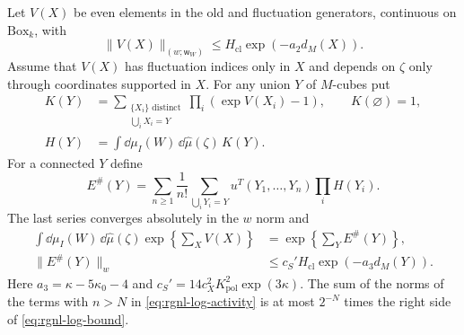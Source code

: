 \begin{proposition}\label{prop:rgnl-cluster-logarithm}
Let $V(X)$ be even elements in the old and fluctuation
generators, continuous on $\mathrm{Box}_k$, with
\[
 \|V(X)\|_{(w;\mathsf w_W)}
                       \le H_{\mathrm{cl}}\exp(-a_2d_M(X)).
\]
Assume that $V(X)$ has fluctuation indices only in $X$ and
depends on $\zeta$ only through coordinates supported in $X$.
For any union $Y$ of $M$-cubes put
\begin{align}
 K(Y)&=\sum_{\substack{\{X_i\}\text{ distinct}\\\bigcup_iX_i=Y}}
                    \prod_i(\exp V(X_i)-1),\qquad K(\varnothing)=1,
                                      \label{eq:rgnl-Mayer-activity}\\
 H(Y)&=\int\dd\mu_I(W)\,\dd\widehat\mu(\zeta)\,K(Y).
                                      \label{eq:rgnl-integrated-activity}
\end{align}
For a connected $Y$ define
\begin{equation}\label{eq:rgnl-log-activity}
 E^\#(Y)=\sum_{n\ge1}\frac1{n!}
   \sum_{\bigcup_iY_i=Y}u^T(Y_1,\ldots,Y_n)\prod_iH(Y_i).
\end{equation}
The last series converges absolutely in the $w$ norm and
\begin{align}
 \int\dd\mu_I(W)\,\dd\widehat\mu(\zeta)
                         \exp\left\{\sum_XV(X)\right\}
       &=\exp\left\{\sum_YE^\#(Y)\right\},
                                      \label{eq:rgnl-log-identity}\\
 \|E^\#(Y)\|_w
       &\le c_S'H_{\mathrm{cl}}\exp(-a_3d_M(Y)).
                                      \label{eq:rgnl-log-bound}
\end{align}
Here $a_3=\kappa-5\kappa_0-4$ and
$c_S'=14c_X^2K_{\mathrm{pol}}^2\exp(3\kappa)$.
The sum of the norms of the terms with $n>N$ in
\eqref{eq:rgnl-log-activity} is at most $2^{-N}$ times the
right side of \eqref{eq:rgnl-log-bound}.
\end{proposition}

